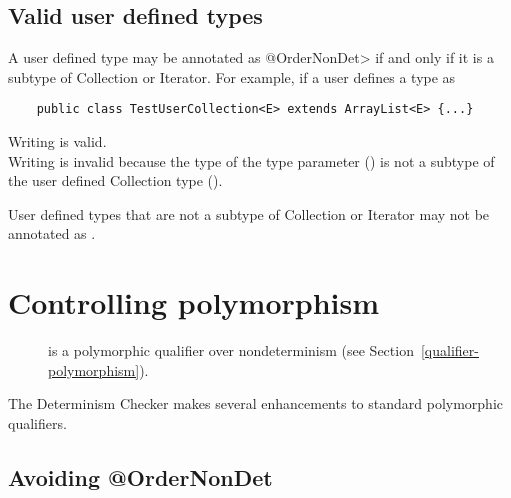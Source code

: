 \subsection{Valid user defined types\label{determinism-valid-user-types}}
A user defined type may be annotated as \<@OrderNonDet> if and only if it
is a subtype of Collection or Iterator.
For example, if a user defines a type as
\begin{Verbatim}
    public class TestUserCollection<E> extends ArrayList<E> {...}
\end{Verbatim}
Writing  is valid.\\
Writing  is invalid
because the type of the type parameter () is not a subtype
of the user defined Collection type ().

User defined types that are not a subtype of Collection or Iterator
may not be annotated as .




\section{Controlling polymorphism\label{determinism-polymorphism}}

\begin{description}
\item[] is a
  polymorphic qualifier over nondeterminism (see Section~\ref{qualifier-polymorphism}).
\end{description}

The Determinism Checker makes
several enhancements to standard polymorphic qualifiers.


\subsection{Avoiding @OrderNonDet\label{determinism-polymorphism-ordernondet}}


